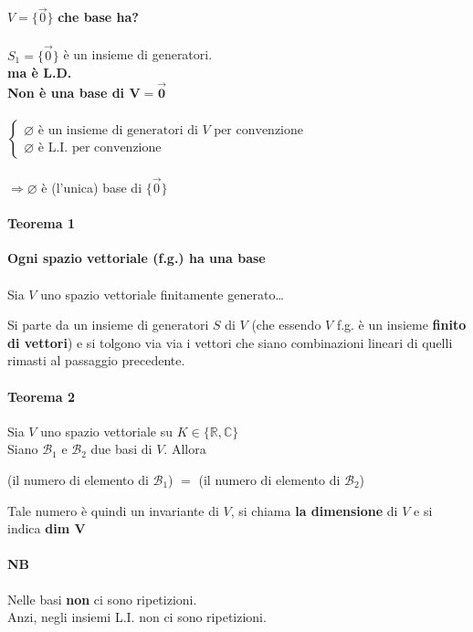 $V=\{\vec{0}\}$ \textbf{che base ha?}\\\\
$S_1=\{\vec{0}\}$ è un insieme di generatori. \\
\textbf{ma è L.D.}\\
\textbf{Non è una base di $\pmb{V=\vec{0}}$}\\\\
$ 
\begin{cases}
    \varnothing \textrm{ è un insieme di generatori di }V\textrm{ per convenzione}\\
    \varnothing \textrm{ è L.I. per convenzione}
\end{cases}
$\\\\
$\Longrightarrow \varnothing$ è (l'unica) base di $\{\vec{0}\}$

\paragraph{Teorema 1} \textbf{Ogni spazio vettoriale (f.g.) ha una base}\\\\
Sia $V$  uno spazio vettoriale finitamente generato\dots

Si parte da un insieme di generatori $S$ di $V$ (che essendo $V$ f.g. è un insieme \textbf{finito di vettori})
e si tolgono via via i vettori che siano combinazioni lineari di quelli rimasti al passaggio precedente.

\paragraph{Teorema 2} Sia $V$ uno spazio vettoriale su $K\in\{\mathbb{R}, \mathbb{C}\}$\\
Siano $\mathcal{B}_1$ e $\mathcal{B}_2$ due basi di $V$. Allora 

\begin{center}
    (il numero di elemento di $\mathcal{B}_1$) $=$ 
    (il numero di elemento di $\mathcal{B}_2$) 
\end{center}

Tale numero è quindi un invariante di $V$, si chiama \textbf{la dimensione} di $V$ e si indica \textbf{dim $\pmb{V}$}

\paragraph{NB} Nelle basi \textbf{non} ci sono ripetizioni.\\
Anzi, negli insiemi L.I. non ci sono ripetizioni. \\

